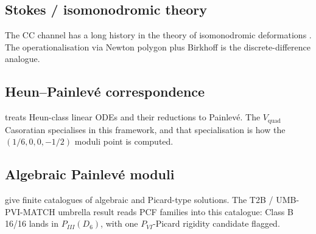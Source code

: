 \documentclass[11pt,reqno]{amsart}
\theoremstyle{plain}
\theoremstyle{definition}
\theoremstyle{remark}
\newcommand{\CC}{\mathrm{CC}}
\newcommand{\Vquad}{V_{\mathrm{quad}}}
\begin{document}
\subsection{Stokes / isomonodromic theory}
The $\CC$ channel has a long history in the theory of
isomonodromic deformations \cite{jimbomiwa1981monodromy,
vanderputsinger2003galois, boalch2001stokes}. The
operationalisation via Newton polygon plus Birkhoff
\cite{siarc_cc_pipeline_g} is the discrete-difference
analogue.

\subsection{Heun--Painlev\'e correspondence}
\cite{slavyanov2000special} treats Heun-class linear ODEs and
their reductions to Painlev\'e. The $\Vquad$ Casoratian
specialises in this framework, and that specialisation is
how the $(1/6, 0, 0, -1/2)$ moduli point is computed.

\subsection{Algebraic Painlev\'e moduli}
\cite{mazzocco2001picard, mazzocco2002painleve, iwasaki1991from,
ohyama2006studies, guzzetticlass2012} give finite catalogues
of algebraic and Picard-type solutions. The T2B /
UMB-PVI-MATCH umbrella result \cite{siarc_t2b_v3} reads PCF
families into this catalogue: Class B 16/16 lands in
$P_{III}(D_6)$, with one $P_{VI}$-Picard rigidity candidate
flagged.
\end{document}
